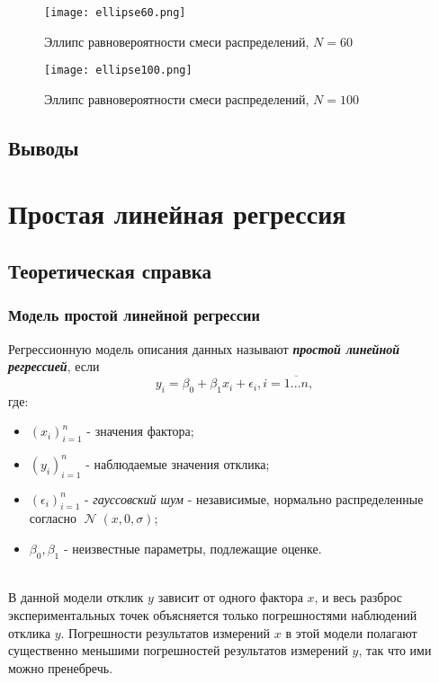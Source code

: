 \documentclass[14pt]{extarticle}
\DeclareMathOperator{\normal}{\mathcal{N}} %
\begin{document}
\begin{figure}[H]
    \centering
    \texttt{[image: ellipse60.png]}
    \caption{Эллипс равновероятности смеси распределений, \(N=60\)}
    \label{fig:enter-label}
\end{figure}

\begin{figure}[H]
    \centering
    \texttt{[image: ellipse100.png]}
    \caption{Эллипс равновероятности смеси распределений, \(N=100\)}
    \label{fig:enter-label}
\end{figure}

\subsection{Выводы}

\section{Простая линейная регрессия}
\subsection{Теоретическая справка}
\subsubsection{Модель простой линейной регрессии}
Регрессионную модель описания данных называют \textbf{\textit{простой линейной регрессией}}, если \[y_i=\beta_0+\beta_1x_i+\epsilon_i, i=\overline{1...n},\] где: 
\begin{itemize}
    \item \((x_i)_{i=1}^n\) - значения фактора;
    \item \((y_i)_{i=1}^n\) - наблюдаемые значения отклика;
    \item \((\epsilon_i)_{i=1}^n\) - \textit{гауссовский шум} - независимые, нормально распределенные согласно \(\normal(x, 0, \sigma)\);
    \item \(\beta_0, \beta_1\) - неизвестные параметры, подлежащие оценке.
\end{itemize}\\
В данной модели отклик \(y\) зависит от одного фактора \(x\), и весь разброс экспериментальных точек объясняется только погрешностями наблюдений отклика \(y\). Погрешности результатов измерений \(x\) в этой модели полагают существенно меньшими погрешностей результатов измерений \(y\), так что ими можно пренебречь.
\end{document}

